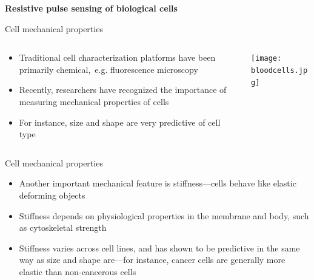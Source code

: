 \begin{frame}[c]{}
	\begin{center}
		\textbf{Resistive pulse sensing of biological cells}
	\end{center}
\end{frame}






\begin{frame}[c]{Cell mechanical properties}
	\begin{columns}[t]
		\begin{column}[T]{2.25in}
			\begin{itemize}
				\item Traditional cell characterization platforms have been primarily chemical,~e.g. fluorescence microscopy
				\item Recently, researchers have recognized the importance of measuring mechanical properties of cells
				\item For instance, size and shape are very predictive of cell type
			\end{itemize}
		\end{column}
		
		
		\begin{column}[T]{2.25in}
			\texttt{[image: bloodcells.jpg]}
		\end{column}


	\end{columns}

	

\end{frame}




\begin{frame}[c]{Cell mechanical properties}
	\begin{itemize}
		\item Another important mechanical feature is stiffness---cells behave like elastic deforming objects
		\item Stiffness depends on physiological properties in the membrane and body, such as cytoskeletal strength
		\item Stiffness varies across cell lines, and has shown to be predictive in the same way as size and shape are---for instance, cancer cells are generally more elastic than non-cancerous cells
		
	\end{itemize}

\end{frame}


